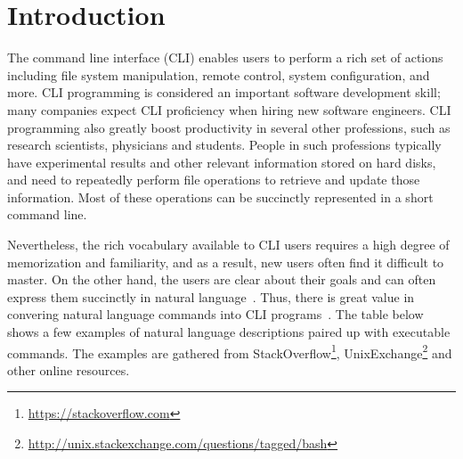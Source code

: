 \section{Introduction}


The command line interface (CLI) enables users to perform a rich set of actions including file system manipulation, remote control, system configuration, and more. CLI programming is considered an important software development skill; many companies expect CLI proficiency when hiring new software engineers. CLI programming also greatly boost productivity in several other professions, such as research scientists, physicians and students. People in such professions typically have experimental results and other relevant information stored on hard disks, and need to repeatedly perform file operations to retrieve and update those information. Most of these operations can be succinctly represented in a short command line.

Nevertheless, the rich vocabulary available to CLI users requires a high degree of memorization and familiarity, and as a result, new users often find it difficult to master. On the other hand, %
the users are clear about their goals and can often express them succinctly in natural language~\cite{Myers:2004:NPL:1015864.1015888}. Thus, there is great value in convering natural language commands into CLI programs~\cite{Pederson-Report,Manaris:1994:DNL:198125.198137,ZOLTANFORD1991527}. The table below shows a few examples of natural language descriptions paired up with executable commands. The examples are gathered from StackOverflow\footnote{\url{https://stackoverflow.com}}, UnixExchange\footnote{\url{http://unix.stackexchange.com/questions/tagged/bash}} and other online resources.

